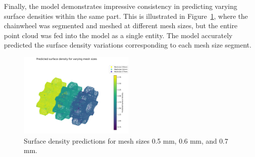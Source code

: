 Finally, the model demonstrates impressive consistency in predicting varying surface densities within the same part. This is illustrated in Figure~\ref{fig:diff_mesh_predict}, where the chainwheel was segmented and meshed at different mesh sizes, but the entire point cloud was fed into the model as a single entity. The model accurately predicted the surface density variations corresponding to each mesh size segment.

\begin{figure}[H]
\centering
\includegraphics[width=0.5\textwidth]{figures/varying_meshsize_lowQ.png}
\caption{Surface density predictions for mesh sizes 0.5 mm, 0.6 mm, and 0.7 mm.}
\label{fig:diff_mesh_predict}
\end{figure}